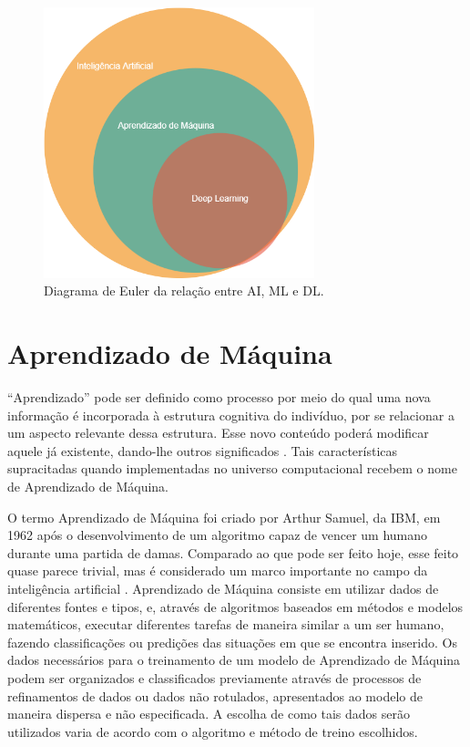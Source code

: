 \begin{figure}[htb]
  \centering
  \caption{\label{fig_euler}Diagrama de Euler da rela{\c c}{\~a}o entre AI, ML e DL.}
  \includegraphics[width=0.7\textwidth]{images/ai-euler.png}
\end{figure}

\section{Aprendizado de M{\'a}quina}

``Aprendizado'' pode ser definido como processo por meio do qual uma
nova informação é incorporada à estrutura cognitiva do indivíduo, por
se relacionar a um aspecto relevante dessa estrutura. Esse novo
conteúdo poderá modificar aquele já existente, dando-lhe outros
significados \cite{michaelis2022}. Tais características supracitadas
quando implementadas no universo computacional recebem o nome de
Aprendizado de Máquina.

O termo Aprendizado de Máquina foi criado por Arthur Samuel, da IBM,
em 1962 após o desenvolvimento de um algoritmo capaz de vencer um
humano durante uma partida de damas. Comparado ao que pode ser feito
hoje, esse feito quase parece trivial, mas é considerado um marco
importante no campo da inteligência artificial \cite{ibm2022}.
Aprendizado de Máquina consiste em utilizar dados de diferentes fontes
e tipos, e, através de algoritmos baseados em métodos e modelos
matemáticos, executar diferentes tarefas de maneira similar a um ser
humano, fazendo classificações ou predições das situações em que se
encontra inserido.  Os dados necessários para o treinamento de um
modelo de Aprendizado de Máquina podem ser organizados e classificados
previamente através de processos de refinamentos de dados ou dados não
rotulados, apresentados ao modelo de maneira dispersa e não
especificada. A escolha de como tais dados serão utilizados varia de
acordo com o algoritmo e método de treino escolhidos.

